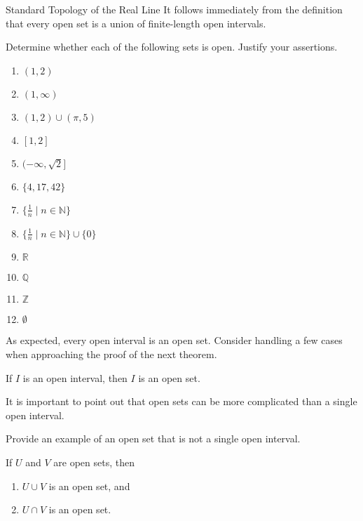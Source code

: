 \begin{section}{Standard Topology of the Real Line}
It follows immediately from the definition that every open set is a union of finite-length open intervals.

\begin{problem}\label{prob:open or not}
Determine whether each of the following sets is open. Justify your assertions.
\begin{multicols}{2}
\begin{enumerate}[label=\textrm{(\alph*)}]
\item $(1,2)$
\item $(1,\infty)$
\item $(1,2)\cup (\pi,5)$
\item $[1,2]$
\item $(-\infty,\sqrt{2}]$
\item $\{4,17,42\}$
\item $\{\frac{1}{n}\mid n\in \mathbb{N}\}$
\item $\{\frac{1}{n}\mid n\in \mathbb{N}\}\cup \{0\}$
\item $\mathbb{R}$
\item $\mathbb{Q}$
\item $\mathbb{Z}$
\item $\emptyset$
\end{enumerate}
\end{multicols}
\end{problem}

As expected, every open interval is an open set. Consider handling a few cases when approaching the proof of the next theorem.

\begin{theorem}
If $I$ is an open interval, then $I$ is an open set. 
\end{theorem}

It is important to point out that open sets can be more complicated than a single open interval.

\begin{problem}
Provide an example of an open set that is not a single open interval.
\end{problem}

\begin{theorem}\label{thm:finite union and intersection of open sets}
If $U$ and $V$ are open sets, then 
\begin{enumerate}[label=\textrm{(\alph*)}]
\item $U\cup V$ is an open set, and
\item $U\cap V$ is an open set.
\end{enumerate}
\end{theorem}


\end{section}
